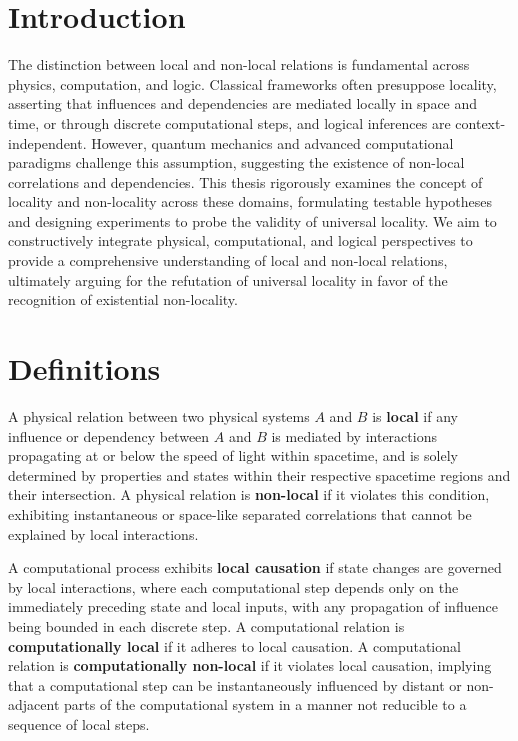 \section{Introduction}

The distinction between local and non-local relations is fundamental across physics, computation, and logic. Classical frameworks often presuppose locality, asserting that influences and dependencies are mediated locally in space and time, or through discrete computational steps, and logical inferences are context-independent. However, quantum mechanics and advanced computational paradigms challenge this assumption, suggesting the existence of non-local correlations and dependencies. This thesis rigorously examines the concept of locality and non-locality across these domains, formulating testable hypotheses and designing experiments to probe the validity of universal locality. We aim to constructively integrate physical, computational, and logical perspectives to provide a comprehensive understanding of local and non-local relations, ultimately arguing for the refutation of universal locality in favor of the recognition of existential non-locality.

\section{Definitions}

\begin{definition}
	A physical relation between two physical systems $A$ and $B$ is \textbf{local} if any influence or dependency between $A$ and $B$ is mediated by interactions propagating at or below the speed of light within spacetime, and is solely determined by properties and states within their respective spacetime regions and their intersection. A physical relation is \textbf{non-local} if it violates this condition, exhibiting instantaneous or space-like separated correlations that cannot be explained by local interactions.
\end{definition}

\begin{definition}
	A computational process exhibits \textbf{local causation} if state changes are governed by local interactions, where each computational step depends only on the immediately preceding state and local inputs, with any propagation of influence being bounded in each discrete step. A computational relation is \textbf{computationally local} if it adheres to local causation. A computational relation is \textbf{computationally non-local} if it violates local causation, implying that a computational step can be instantaneously influenced by distant or non-adjacent parts of the computational system in a manner not reducible to a sequence of local steps.
\end{definition}

